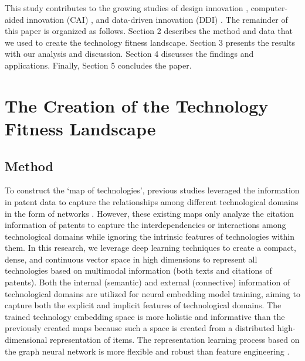 \documentclass{article}
\begin{document}
This study contributes to the growing studies of design innovation \cite{Li2021,Fiorineschi2021}, computer-aided innovation (CAI) \cite{Luo2021,han2018computational,Chen2019}, and data-driven innovation (DDI) \cite{Luo2022,Jiang2021datadriven,Jiang2022}. The remainder of this paper is organized as follows. Section 2 describes the method and data that we used to create the technology fitness landscape. Section 3 presents the results with our analysis and discussion. Section 4 discusses the findings and applications. Finally, Section 5 concludes the paper.

\section{The Creation of the Technology Fitness Landscape}
\label{sec:sec2}

\subsection{Method}

To construct the ‘map of technologies’, previous studies leveraged the information in patent data to capture the relationships among different technological domains in the form of networks \cite{Luo2019,Acemoglu2016,fleming2004science}. However, these existing maps only analyze the citation information of patents to capture the interdependencies or interactions among technological domains while ignoring the intrinsic features of technologies within them. In this research, we leverage deep learning techniques to create a compact, dense, and continuous vector space in high dimensions to represent all technologies based on multimodal information (both texts and citations of patents). Both the internal (semantic) and external (connective) information of technological domains are utilized for neural embedding model training, aiming to capture both the explicit and implicit features of technological domains. The trained technology embedding space is more holistic and informative than the previously created maps because such a space is created from a distributed high-dimensional representation of items. The representation learning process based on the graph neural network is more flexible and robust than feature engineering \cite{levy2015improving}.
\end{document}
